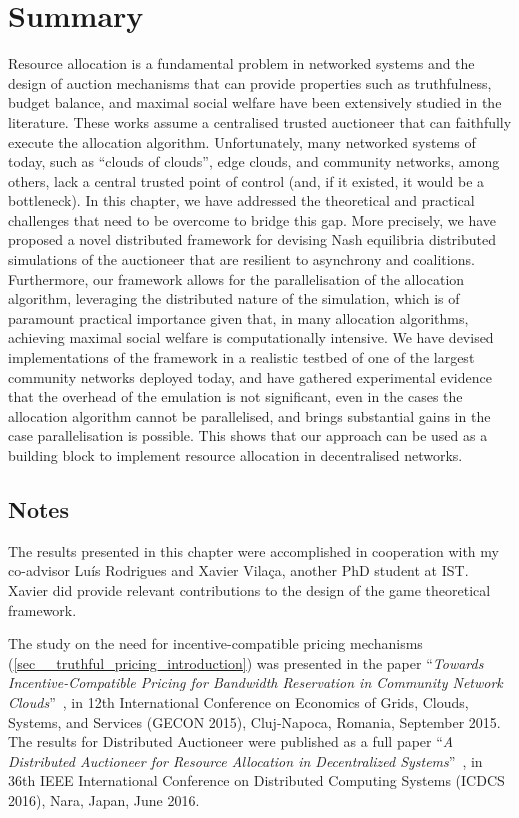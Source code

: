 
\section{Summary}
\label{sec__dist_auctioneer_conclusion}

Resource allocation is a fundamental problem in networked systems and the design of auction mechanisms that can provide properties such as
truthfulness, budget balance, and maximal social welfare have been extensively studied in the literature. 
These works assume a centralised trusted auctioneer that can faithfully execute the allocation algorithm. 
Unfortunately, many networked systems of today, such as \enquote{clouds of clouds}, edge clouds, and community networks, among others, lack a central trusted point of control (and, if it existed, it would be a bottleneck). 
In this chapter, we have addressed the theoretical and practical challenges that need to be overcome to bridge this gap. 
More precisely, we have proposed a novel distributed framework for devising Nash equilibria 
distributed simulations of the auctioneer that are resilient to asynchrony and coalitions. 
Furthermore, our framework allows for the parallelisation of the allocation algorithm, 
leveraging the distributed nature of the simulation, which is of paramount practical importance given that, 
in many allocation algorithms, achieving maximal social welfare is computationally intensive. 
We have devised implementations of the framework in a realistic testbed of one of the largest community networks deployed today, 
and have gathered experimental evidence that the overhead of the emulation 
is not significant, 
even in the cases the allocation algorithm cannot be parallelised, 
and brings substantial gains in the case parallelisation is possible. 
This shows that our approach can be used as a building block to implement resource allocation in decentralised networks.

\subsection*{Notes}
The results presented in this chapter were accomplished in cooperation 
with my co-advisor Luís Rodrigues and Xavier Vilaça, another PhD student at IST. 
Xavier did provide relevant contributions to the design of the game theoretical framework.

The study on the need for incentive-compatible pricing mechanisms (\cref{sec__truthful_pricing_introduction}) 
was presented in the paper 
	\enquote{\emph{Towards Incentive-Compatible Pricing for Bandwidth Reservation in Community Network Clouds}}~\cite{Khan2015Towards}, 
	in 12th International Conference on Economics of Grids, Clouds, Systems, and Services (GECON 2015), 
	Cluj-Napoca, Romania, September 2015.
The results for Distributed Auctioneer were published as a full paper 
	\enquote{\emph{A Distributed Auctioneer for Resource Allocation in Decentralized Systems}}~\cite{Khan2016Distributed}, 
	in 36th IEEE International Conference on Distributed Computing Systems (ICDCS 2016), Nara, Japan, June 2016.
